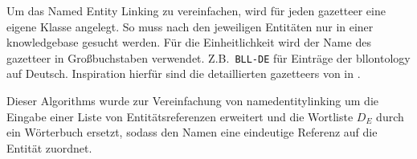 Um das Named Entity Linking zu vereinfachen,
wird für jeden \gls{gazetteer}
eine eigene Klasse angelegt.
So muss nach den jeweiligen Entitäten nur in einer \gls{knowledgebase} gesucht werden.  
Für die Einheitlichkeit wird der Name des \gls{gazetteer} in Großbuchstaben verwendet.
Z.B.\, \texttt{BLL-DE} für Einträge der \gls{bllontology} auf Deutsch.
Inspiration hierfür sind die detaillierten \glspl{gazetteer}
von \citeauthor{Leitner2019} in  \autocite{Leitner2019}.

Dieser Algorithms wurde zur Vereinfachung von \gls{namedentitylinking}
um die Eingabe einer Liste von Entitätsreferenzen erweitert
und die Wortliste $D_E$ durch ein Wörterbuch ersetzt, 
sodass den Namen eine eindeutige Referenz auf die Entität zuordnet.